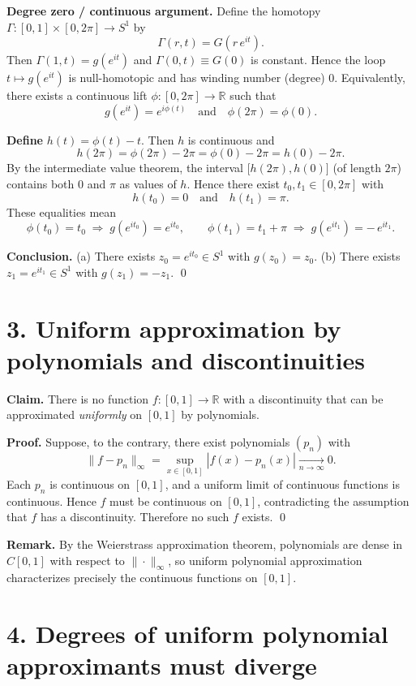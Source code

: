 \documentclass[11pt,a4paper]{article}
\theoremstyle{definition}
\theoremstyle{definition}
\theoremstyle{plain}
\theoremstyle{remark}
\begin{document}
\medskip

\noindent\textbf{Degree zero / continuous argument.}
Define the homotopy $\Gamma:[0,1]\times[0,2\pi]\to S^1$ by
\[
\Gamma(r,t)=G\!\left(r\,e^{it}\right).
\]
Then $\Gamma(1,t)=g(e^{it})$ and $\Gamma(0,t)\equiv G(0)$ is constant.
Hence the loop $t\mapsto g(e^{it})$ is null-homotopic and has winding number (degree) $0$.
Equivalently, there exists a continuous lift $\phi:[0,2\pi]\to\mathbb{R}$ such that
\[
g(e^{it})=e^{i\phi(t)}\quad\text{and}\quad \phi(2\pi)=\phi(0).
\]

\medskip

\noindent\textbf{Define } $h(t)=\phi(t)-t$. Then $h$ is continuous and
\[
h(2\pi)=\phi(2\pi)-2\pi=\phi(0)-2\pi=h(0)-2\pi.
\]
By the intermediate value theorem, the interval $\big[h(2\pi),h(0)\big]$ (of length $2\pi$)
contains both $0$ and $\pi$ as values of $h$. Hence there exist $t_0,t_1\in[0,2\pi]$ with
\[
h(t_0)=0 \quad\text{and}\quad h(t_1)=\pi.
\]
These equalities mean
\[
\phi(t_0)=t_0 \;\Rightarrow\; g(e^{it_0})=e^{it_0}, \qquad
\phi(t_1)=t_1+\pi \;\Rightarrow\; g(e^{it_1})=-\,e^{it_1}.
\]

\medskip

\noindent\textbf{Conclusion.}
(a) There exists $z_0=e^{it_0}\in S^1$ with $g(z_0)=z_0$.
(b) There exists $z_1=e^{it_1}\in S^1$ with $g(z_1)=-z_1$.
\qed

\section*{3. Uniform approximation by polynomials and discontinuities}

\textbf{Claim.} There is no function $f:[0,1]\to\mathbb{R}$ with a discontinuity that can be approximated
\emph{uniformly} on $[0,1]$ by polynomials.

\textbf{Proof.}
Suppose, to the contrary, there exist polynomials $(p_n)$ with
\[
\|f-p_n\|_\infty=\sup_{x\in[0,1]} |f(x)-p_n(x)| \xrightarrow[n\to\infty]{} 0.
\]
Each $p_n$ is continuous on $[0,1]$, and a uniform limit of continuous functions is continuous.
Hence $f$ must be continuous on $[0,1]$, contradicting the assumption that $f$ has a discontinuity.
Therefore no such $f$ exists. \qed

\medskip
\textbf{Remark.} By the Weierstrass approximation theorem, polynomials are dense in $C[0,1]$
with respect to $\|\cdot\|_\infty$, so uniform polynomial approximation characterizes precisely the
continuous functions on $[0,1]$.

\section*{4. Degrees of uniform polynomial approximants must diverge}
\end{document}
